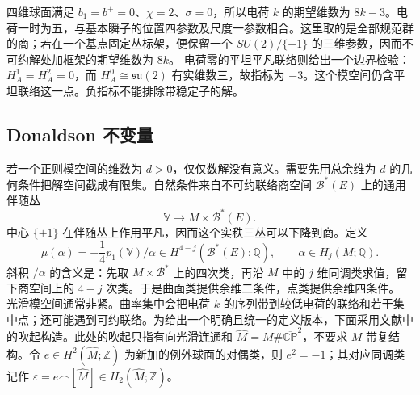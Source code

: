 \begin{example}\label{g3:exm:B-sphere-asd-dimension}
 四维球面满足 \(b_1=b^+=0\)、\(\chi=2\)、\(\sigma=0\)，所以电荷 \(k\) 的期望维数为 \(8k-3\)。电荷一时为五，与基本瞬子的位置四参数及尺度一参数相合。这里取的是全部规范群的商；若在一个基点固定丛标架，便保留一个 \(SU(2)/\{\pm1\}\) 的三维参数，因而不可约解处加框架的期望维数为 \(8k\)。
 \ProseParagraphBreak
 电荷零的平坦平凡联络则给出一个边界检验：\(H_A^1=H_A^2=0\)，而 \(H_A^0\cong\mathfrak{su}(2)\) 有实维数三，故指标为 \(-3\)。这个模空间仍含平坦联络这一点。负指标不能排除带稳定子的解。
\end{example}

\subsection{Donaldson 不变量}
\label{g3:subsec:B04:03}

若一个正则模空间的维数为 \(d>0\)，仅仅数解没有意义。需要先用总余维为 \(d\) 的几何条件把解空间截成有限集。自然条件来自不可约联络商空间 \(\mathcal B^*(E)\) 上的通用伴随丛
\[
 \mathbb V\longrightarrow M\times\mathcal B^*(E).
\]
中心 \(\{\pm1\}\) 在伴随丛上作用平凡，因而这个实秩三丛可以下降到商。定义
\begin{equation}\label{g3:eq:B-donaldson-mu}
 \mu(\alpha)=-\frac14p_1(\mathbb V)/\alpha
 \in H^{4-j}(\mathcal B^*(E);\mathbb Q),
 \qquad \alpha\in H_j(M;\mathbb Q).
\end{equation}
斜积 \(/\alpha\) 的含义是：先取 \(M\times\mathcal B^*\) 上的四次类，再沿 \(M\) 中的 \(j\) 维同调类求值，留下商空间上的 \(4-j\) 次类。于是曲面类提供余维二条件，点类提供余维四条件。
\ProseParagraphBreak
光滑模空间通常非紧。曲率集中会把电荷 \(k\) 的序列带到较低电荷的联络和若干集中点；还可能遇到可约联络。为给出一个明确且统一的定义版本，下面采用文献中的吹起构造。此处的吹起只指有向光滑连通和
\(\widehat M=M\#\overline{\mathbb{CP}}^2\)，不要求 \(M\) 带复结构。令 \(e\in H^2(\widehat M;\mathbb Z)\) 为新加的例外球面的对偶类，则 \(e^2=-1\)；其对应同调类记作 \(\varepsilon=e\frown[\widehat M]\in H_2(\widehat M;\mathbb Z)\)。

